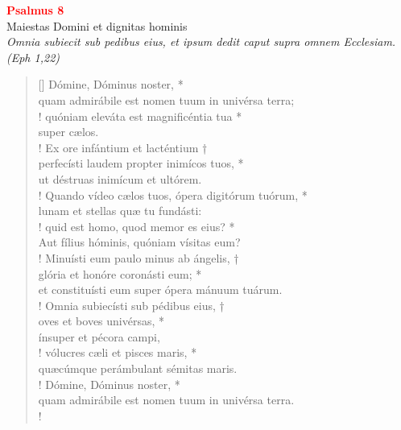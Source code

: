 


\def\greinitialformat#1{%
{\fontsize{39}{39}\selectfont #1}%
}




\vspace{0.3cm}
\begin{center}
 \textcolor{red}{\large \bf Psalmus 8}\\
Maiestas Domini et dignitas hominis\\
\textit{\small Omnia subiecit sub pedibus eius, et ipsum dedit caput supra omnem Ecclesiam. (Eph 1,22)}
\end{center}
\begin{verse}[\versewidth]
Dómine, Dóminus noster, *\\
quam admirábile est nomen tuum in univérsa terra;\\!
\vin quóniam eleváta est magnificéntia tua *\\
\vin super cælos.\\!
Ex ore infántium et lacténtium †\\
perfecísti laudem propter inimícos tuos, *\\
ut déstruas inimícum et ultórem.\\!
\vin Quando vídeo cælos tuos, ópera digitórum tuórum, *\\
\vin lunam et stellas quæ tu fundásti:\\!
quid est homo, quod memor es eius? *\\
Aut fílius hóminis, quóniam vísitas eum?\\!
\vin Minuísti eum paulo minus ab ángelis, †\\
\vin glória et honóre coronásti eum; *\\
\vin et constituísti eum super ópera mánuum tuárum.\\!
Omnia subiecísti sub pédibus eius, †\\
oves et boves univérsas, *\\
ínsuper et pécora campi,\\!
\vin vólucres cæli et pisces maris, *\\
\vin quæcúmque perámbulant sémitas maris.\\!
Dómine, Dóminus noster, *\\
quam admirábile est nomen tuum in univérsa terra.\\!
\end{verse}
\vspace{1cm}


